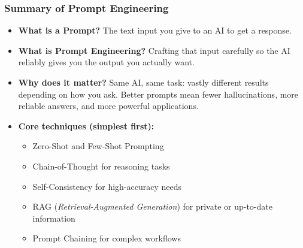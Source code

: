 \begin{frame}[fragile]\frametitle{Summary of Prompt Engineering}

\begin{itemize}
  \item \textbf{What is a Prompt?} The text input you give to an AI to get a response.

  \item \textbf{What is Prompt Engineering?} Crafting that input carefully so the AI reliably gives you the output you actually want.

  \item \textbf{Why does it matter?} Same AI, same task: vastly different results depending on how you ask. Better prompts mean fewer hallucinations, more reliable answers, and more powerful applications.

  \item \textbf{Core techniques (simplest first):}
    \begin{itemize}
      \item Zero-Shot and Few-Shot Prompting
      \item Chain-of-Thought for reasoning tasks
      \item Self-Consistency for high-accuracy needs
      \item RAG (\emph{Retrieval-Augmented Generation}) for private or up-to-date information
      \item Prompt Chaining for complex workflows
    \end{itemize}
\end{itemize}


\end{frame}


